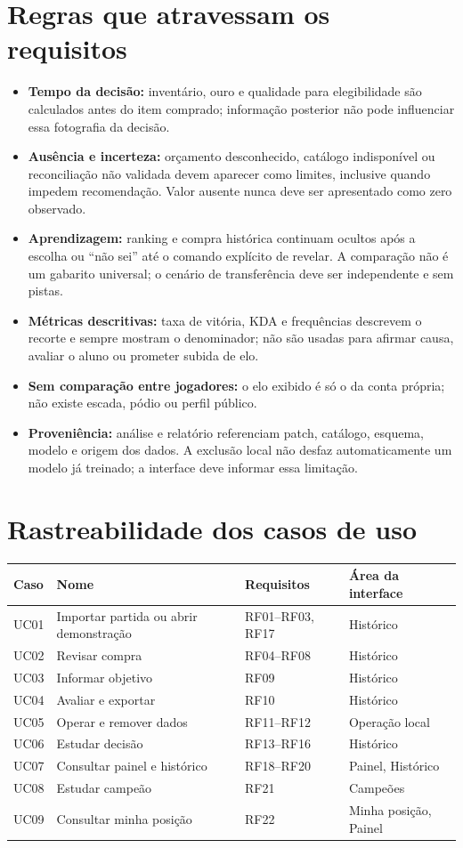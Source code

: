 \documentclass[12pt,a4paper]{article}
\begin{document}
\section{Regras que atravessam os requisitos}
\begin{itemize}
  \item \textbf{Tempo da decisão:} inventário, ouro e qualidade para elegibilidade são
  calculados antes do item comprado; informação posterior não pode influenciar essa
  fotografia da decisão.
  \item \textbf{Ausência e incerteza:} orçamento desconhecido, catálogo indisponível ou
  reconciliação não validada devem aparecer como limites, inclusive quando impedem
  recomendação. Valor ausente nunca deve ser apresentado como zero observado.
  \item \textbf{Aprendizagem:} ranking e compra histórica continuam ocultos após a escolha
  ou ``não sei'' até o comando explícito de revelar. A comparação não é um gabarito
  universal; o cenário de transferência deve ser independente e sem pistas.
  \item \textbf{Métricas descritivas:} taxa de vitória, KDA e frequências descrevem o recorte
  e sempre mostram o denominador; não são usadas para afirmar causa, avaliar o aluno ou
  prometer subida de elo.
  \item \textbf{Sem comparação entre jogadores:} o elo exibido é só o da conta própria; não
  existe escada, pódio ou perfil público.
  \item \textbf{Proveniência:} análise e relatório referenciam patch, catálogo, esquema,
  modelo e origem dos dados. A exclusão local não desfaz automaticamente um modelo já
  treinado; a interface deve informar essa limitação.
\end{itemize}

\section{Rastreabilidade dos casos de uso}
\begin{center}
\begin{tabular}{@{}p{1.6cm}p{5.2cm}p{3.4cm}p{3.6cm}@{}}
\toprule
Caso & Nome & Requisitos & Área da interface \\
\midrule
UC01 & Importar partida ou abrir demonstração & RF01--RF03, RF17 & Histórico \\
UC02 & Revisar compra & RF04--RF08 & Histórico \\
UC03 & Informar objetivo & RF09 & Histórico \\
UC04 & Avaliar e exportar & RF10 & Histórico \\
UC05 & Operar e remover dados & RF11--RF12 & Operação local \\
UC06 & Estudar decisão & RF13--RF16 & Histórico \\
UC07 & Consultar painel e histórico & RF18--RF20 & Painel, Histórico \\
UC08 & Estudar campeão & RF21 & Campeões \\
UC09 & Consultar minha posição & RF22 & Minha posição, Painel \\
\bottomrule
\end{tabular}
\end{center}
\end{document}
